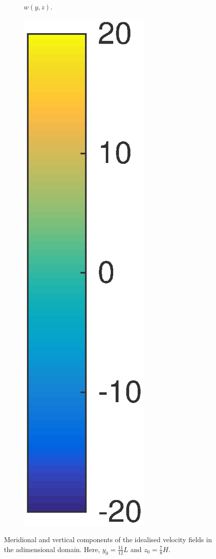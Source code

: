 \begin{figure}[ht]
\begin{subfigure}[t]{0.4\textwidth}
		\caption{$w(y,z)$.}
		\label{fig:w_overturner}
	\end{subfigure}
	\begin{subfigure}[t]{0.1\textwidth}
		\includegraphics[height = 4\textwidth]{fig/overturner/colorbarVW.eps}
	\end{subfigure}
	\caption{Meridional and vertical components of the idealised velocity fields in the adimensional domain. Here, $y_0 = \frac{11}{12}L$ and $z_0 = \frac{7}{8}H$.}
	\label{fig:vw_overturner}
\end{figure}


